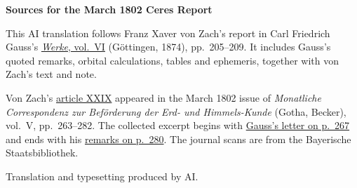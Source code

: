 \clearpage\thispagestyle{empty}
\begin{center}\textbf{Sources for the March 1802 Ceres Report}\end{center}
\noindent This AI translation follows Franz Xaver von Zach’s report in Carl Friedrich Gauss’s \href{https://gdz.sub.uni-goettingen.de/id/PPN236007467}{\textit{Werke}, vol.~VI} (Göttingen, 1874), pp.~205--209. It includes Gauss’s quoted remarks, orbital calculations, tables and ephemeris, together with von Zach’s text and note.
\par\smallskip\noindent Von Zach’s \href{https://api.digitale-sammlungen.de/iiif/image/v2/bsb10538597_00273/full/1450,/0/default.jpg}{article XXIX} appeared in the March 1802 issue of \textit{Monatliche Correspondenz zur Beförderung der Erd- und Himmels-Kunde} (Gotha, Becker), vol.~V, pp.~263--282. The collected excerpt begins with \href{https://api.digitale-sammlungen.de/iiif/image/v2/bsb10538597_00277/full/1450,/0/default.jpg}{Gauss’s letter on p.~267} and ends with his \href{https://api.digitale-sammlungen.de/iiif/image/v2/bsb10538597_00290/full/1450,/0/default.jpg}{remarks on p.~280}. The journal scans are from the Bayerische Staatsbibliothek.
\par\smallskip\noindent Translation and typesetting produced by AI.
\clearpage
